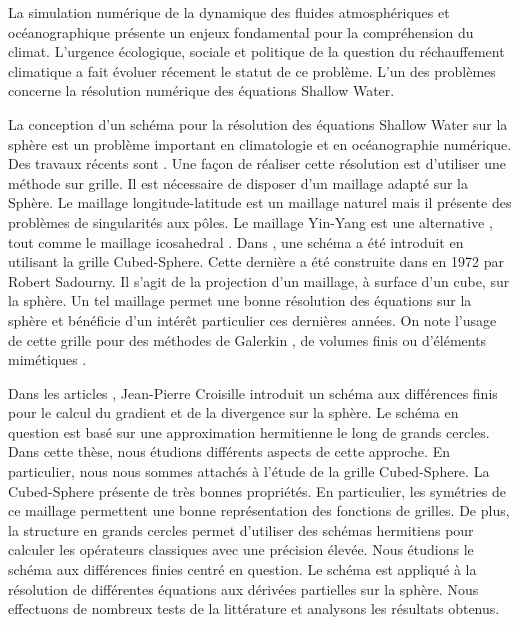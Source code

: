 La simulation numérique de la dynamique des fluides atmosphériques et océanographique présente un enjeux fondamental pour la compréhension du climat. L'urgence écologique, sociale et politique de la question du réchauffement climatique a fait évoluer récement le statut de ce problème. L'un des problèmes concerne la résolution numérique des équations Shallow Water.

La conception d'un schéma pour la résolution des équations Shallow Water sur la sphère est un problème important en climatologie et en océanographie numérique. Des travaux récents sont \cite{Nair2010, Qaddouri2012, Ullrich2011}. Une façon de réaliser cette résolution est d'utiliser une méthode sur grille. Il est nécessaire de disposer d'un maillage adapté sur la Sphère. Le maillage longitude-latitude est un maillage naturel mais il présente des problèmes de singularités aux pôles. Le maillage Yin-Yang est une alternative \cite{Kageyama2004, Li2008}, tout comme le maillage icosahedral \cite{Stuhne1999}. 
Dans \cite{Croisille2015, Croisille2013}, une schéma a été introduit en utilisant la grille Cubed-Sphere. Cette dernière a été construite dans \cite{Sadourny1972} en 1972 par Robert Sadourny. Il s'agit de la projection d'un maillage, à surface d'un cube, sur la sphère. Un tel maillage permet une bonne résolution des équations sur la sphère \cite{Ronchi1996} et bénéficie d'un intérêt particulier ces dernières années. On note l'usage de cette grille pour des méthodes de Galerkin \cite{Nair2010}, de volumes finis \cite{Ullrich2011, Chen2008} ou d'éléments mimétiques \cite{Lauritzen2010}.

Dans les articles \cite{Croisille2015,Croisille2013}, Jean-Pierre Croisille introduit un schéma aux différences finis pour le calcul du gradient et de la divergence sur la sphère. Le schéma en question est basé sur une approximation hermitienne le long de grands cercles. Dans cette thèse, nous étudions différents aspects de cette approche. En particulier, nous nous sommes attachés à l'étude de la grille Cubed-Sphere. La Cubed-Sphere présente de très bonnes propriétés. En particulier, les symétries de ce maillage permettent une bonne représentation des fonctions de grilles. De plus, la structure en grands cercles permet d'utiliser des schémas hermitiens pour calculer les opérateurs classiques avec une précision élevée. Nous étudions le schéma aux différences finies centré en question. Le schéma est appliqué à la résolution de différentes équations aux dérivées partielles sur la sphère. Nous effectuons de nombreux tests de la littérature et analysons les résultats obtenus.




